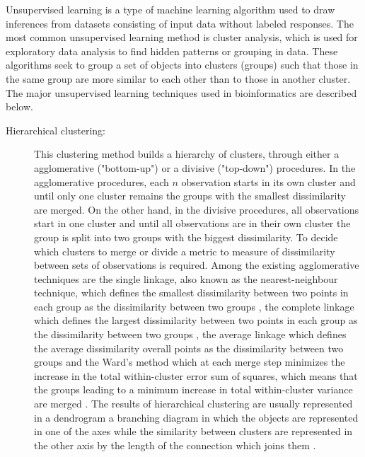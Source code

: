 Unsupervised learning is a type of machine learning algorithm used to draw inferences from datasets consisting of input data without labeled responses.
The most common unsupervised learning method is cluster analysis, which is used for exploratory data analysis to find hidden patterns or grouping in data. These algorithms seek to group a set of objects into clusters (groups)
such that those in the same group are more similar to each other than to those in another cluster.
The major unsupervised learning techniques used in bioinformatics are described below.
\begin{description}

\item[Hierarchical clustering:] {This clustering method builds a hierarchy of clusters,
through either a agglomerative ("bottom-up") or a divisive ("top-down") procedures.
In the agglomerative procedures, each $n$ observation starts in its own cluster and until only one cluster remains the groups with the smallest dissimilarity are merged.
On the other hand, in the divisive procedures, all observations start in one cluster and until all observations are in their own cluster the group is split into two groups with the biggest dissimilarity. To decide which clusters to merge or divide a metric to measure of dissimilarity between sets of observations is required.
Among the existing agglomerative techniques are the single linkage, also known as the nearest-neighbour technique, which defines the smallest dissimilarity between two points in each group as the dissimilarity between two groups \cite{florek1951liaison}, the complete linkage which defines the largest dissimilarity between two points in each group as the dissimilarity between two groups \cite{defays1977efficient}, the average linkage which defines the average dissimilarity overall points as the dissimilarity between two groups \cite{sokal1958statistical} and the Ward’s method which at each merge step minimizes the increase in the total within-cluster error sum of
squares, which means that  the groups leading to a minimum increase in total within-cluster variance are merged \cite{ward1963hierarchical,everitt2011hierarchical}.
The results of hierarchical clustering are usually represented in a dendrogram a branching diagram in which the objects are represented in one of the axes while the similarity between clusters are represented in the other axis by the length of the connection which joins them \cite{manning1999foundations}.}


\end{description}
